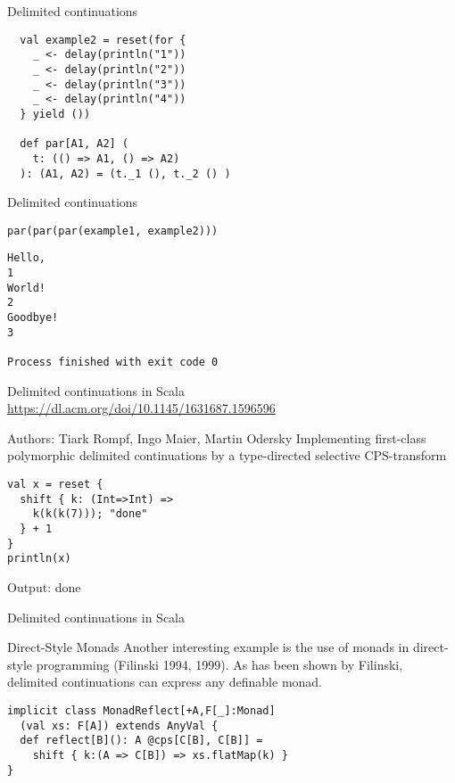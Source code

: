 \documentclass{beamer}
\begin{document}
    \begin{frame}[fragile]{Delimited continuations}
        \begin{example}
            \begin{lstlisting}
  val example2 = reset(for {
    _ <- delay(println("1"))
    _ <- delay(println("2"))
    _ <- delay(println("3"))
    _ <- delay(println("4"))
  } yield ())

  def par[A1, A2] (
    t: (() => A1, () => A2)
  ): (A1, A2) = (t._1 (), t._2 () )
            \end{lstlisting}
        \end{example}
    \end{frame}

    \begin{frame}[fragile]{Delimited continuations}
        \begin{example}
            \begin{lstlisting}
par(par(par(example1, example2)))
            \end{lstlisting}
        \end{example}
        \begin{verbatim}
Hello,
1
World!
2
Goodbye!
3

Process finished with exit code 0
        \end{verbatim}
    \end{frame}

    \begin{frame}[fragile]{Delimited continuations in Scala}
        \url{https://dl.acm.org/doi/10.1145/1631687.1596596}
        \begin{block}{Authors: Tiark Rompf, Ingo Maier, Martin Odersky}
            Implementing first-class polymorphic delimited continuations
            by a type-directed selective CPS-transform
        \end{block}
        \begin{example}
            \begin{lstlisting}
val x = reset {
  shift { k: (Int=>Int) =>
    k(k(k(7))); "done"
  } + 1
}
println(x)
            \end{lstlisting}
            Output: done
        \end{example}
    \end{frame}

    \begin{frame}[fragile]{Delimited continuations in Scala}
        \begin{block}{Direct-Style Monads}
            Another interesting example is the use of monads in direct-style programming (Filinski 1994, 1999).
            As has been shown by Filinski, delimited continuations can express any definable monad.
        \end{block}
        \begin{example}
            \begin{lstlisting}
implicit class MonadReflect[+A,F[_]:Monad]
  (val xs: F[A]) extends AnyVal {
  def reflect[B](): A @cps[C[B], C[B]] =
    shift { k:(A => C[B]) => xs.flatMap(k) }
}
            \end{lstlisting}
        \end{example}
    \end{frame}
\end{document}

